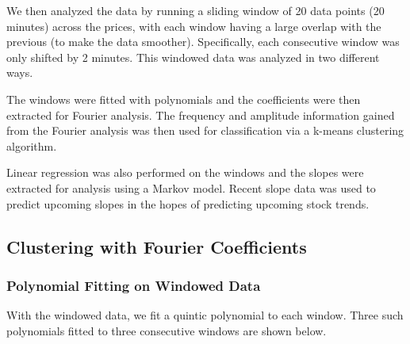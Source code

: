 \documentclass[final]{article}
\begin{document}
We then analyzed the data by running a sliding window of 20 data points (20
minutes) across the prices, with each window having a large overlap with the
previous (to make the data smoother). Specifically, each consecutive window was
only shifted by 2 minutes. This windowed data was analyzed in two different ways.

The windows were fitted with polynomials and the coefficients were then
extracted for Fourier analysis. The frequency and amplitude information gained
from the Fourier analysis was then used for classification via a k-means
clustering algorithm.

Linear regression was also performed on the windows and the slopes were
extracted for analysis using a Markov model. Recent slope data was used to
predict upcoming slopes in the hopes of predicting upcoming stock trends.

\subsection{Clustering with Fourier Coefficients}

\subsubsection{Polynomial Fitting on Windowed Data}

With the windowed data, we fit a quintic polynomial to each window. Three such
polynomials fitted to three consecutive windows are shown below.
\end{document}
